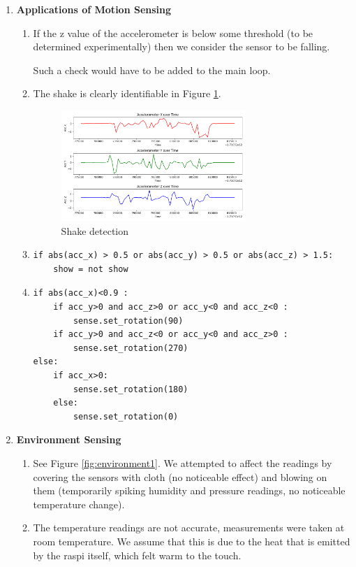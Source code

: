 \documentclass{article}
\begin{document}
\begin{enumerate}[label={\arabic*.}]
    \item \textbf{Applications of Motion Sensing}
    \begin{enumerate}
        \item If the z value of the accelerometer is below some threshold (to be determined experimentally) then we consider the sensor to be falling.
        
        Such a check would have to be added to the main loop.

        \item The shake is clearly identifiable in Figure \ref{fig:shake1}.
     \begin{figure}
            \centering
            \includegraphics[width=0.7\textwidth]{scripts/shake1.png}
            \caption{Shake detection}
            \label{fig:shake1}
        \end{figure}

        \item
        \begin{verbatim}
if abs(acc_x) > 0.5 or abs(acc_y) > 0.5 or abs(acc_z) > 1.5:
    show = not show
        \end{verbatim}

        \pagebreak
        \item
        \begin{verbatim}
if abs(acc_x)<0.9 :
    if acc_y>0 and acc_z>0 or acc_y<0 and acc_z<0 :
        sense.set_rotation(90)
    if acc_y>0 and acc_z<0 or acc_y<0 and acc_z>0 :
        sense.set_rotation(270)
else:
    if acc_x>0:
        sense.set_rotation(180)
    else:
        sense.set_rotation(0)
        \end{verbatim}

    \end{enumerate}

    \item \textbf{Environment Sensing}
    \begin{enumerate}
        \item See Figure \ref{fig:environment1}. We attempted to affect the readings by covering the sensors with cloth (no noticeable effect) and blowing on them (temporarily spiking humidity and pressure readings, no noticeable temperature change).
    
 
        \item The temperature readings are not accurate, measurements were taken at room temperature. We assume that this is due to the heat that is emitted by the raspi itself, which felt warm to the touch.
    \end{enumerate}
\end{enumerate}
\end{document}
